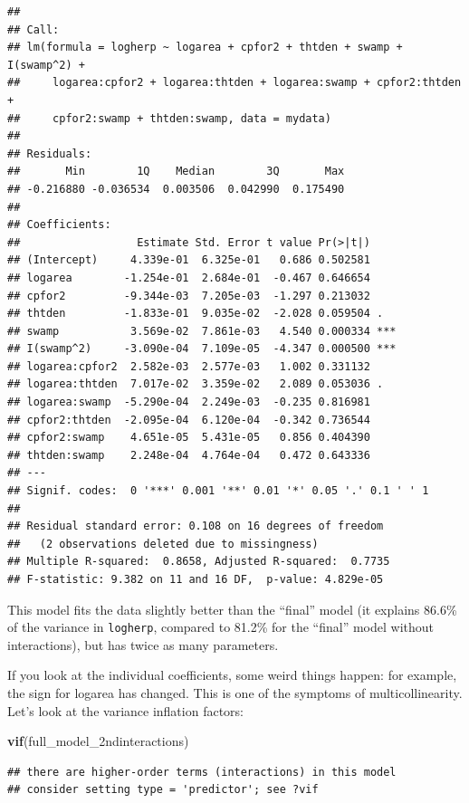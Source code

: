\documentclass[
  12pt,
]{book}
\newenvironment{Shaded}{\begin{snugshade}}{\end{snugshade}}
\newcommand{\KeywordTok}[1]{\textcolor[rgb]{0.13,0.29,0.53}{\textbf{#1}}}
\newcommand{\NormalTok}[1]{#1}
\begin{document}
\begin{verbatim}
## 
## Call:
## lm(formula = logherp ~ logarea + cpfor2 + thtden + swamp + I(swamp^2) + 
##     logarea:cpfor2 + logarea:thtden + logarea:swamp + cpfor2:thtden + 
##     cpfor2:swamp + thtden:swamp, data = mydata)
## 
## Residuals:
##       Min        1Q    Median        3Q       Max 
## -0.216880 -0.036534  0.003506  0.042990  0.175490 
## 
## Coefficients:
##                  Estimate Std. Error t value Pr(>|t|)    
## (Intercept)     4.339e-01  6.325e-01   0.686 0.502581    
## logarea        -1.254e-01  2.684e-01  -0.467 0.646654    
## cpfor2         -9.344e-03  7.205e-03  -1.297 0.213032    
## thtden         -1.833e-01  9.035e-02  -2.028 0.059504 .  
## swamp           3.569e-02  7.861e-03   4.540 0.000334 ***
## I(swamp^2)     -3.090e-04  7.109e-05  -4.347 0.000500 ***
## logarea:cpfor2  2.582e-03  2.577e-03   1.002 0.331132    
## logarea:thtden  7.017e-02  3.359e-02   2.089 0.053036 .  
## logarea:swamp  -5.290e-04  2.249e-03  -0.235 0.816981    
## cpfor2:thtden  -2.095e-04  6.120e-04  -0.342 0.736544    
## cpfor2:swamp    4.651e-05  5.431e-05   0.856 0.404390    
## thtden:swamp    2.248e-04  4.764e-04   0.472 0.643336    
## ---
## Signif. codes:  0 '***' 0.001 '**' 0.01 '*' 0.05 '.' 0.1 ' ' 1
## 
## Residual standard error: 0.108 on 16 degrees of freedom
##   (2 observations deleted due to missingness)
## Multiple R-squared:  0.8658, Adjusted R-squared:  0.7735 
## F-statistic: 9.382 on 11 and 16 DF,  p-value: 4.829e-05
\end{verbatim}

This model fits the data slightly better than the ``final'' model (it explains 86.6\% of the variance in \texttt{logherp}, compared to 81.2\% for the ``final'' model without interactions), but has twice as many parameters.

If you look at the individual coefficients, some weird things happen: for example, the sign for logarea has changed. This is one of the symptoms of multicollinearity. Let's look at the variance inflation factors:

\begin{Shaded}
\begin{Highlighting}[]
\KeywordTok{vif}\NormalTok{(full\_model\_2ndinteractions)}
\end{Highlighting}
\end{Shaded}

\begin{verbatim}
## there are higher-order terms (interactions) in this model
## consider setting type = 'predictor'; see ?vif
\end{verbatim}
\end{document}
